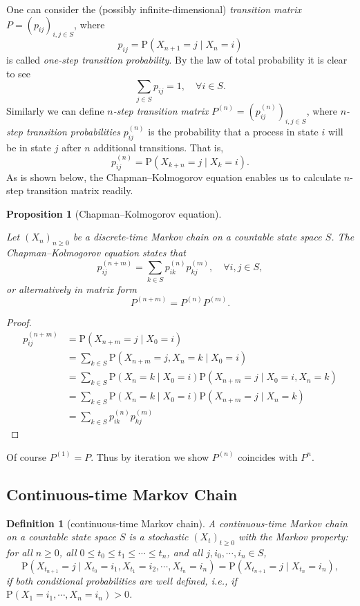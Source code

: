 \documentclass{article}
\newtheorem{definition}{Definition}[section]
\newtheorem{proposition}{Proposition}[section]
\theoremstyle{nonumberplain}
\newtheorem{proof}{Proof.}
\begin{document}
\noindent One can consider the (possibly infinite-dimensional) \emph{transition matrix}	$P=(p_{ij})_{i,j\in S}$, where
\[
p_{ij}=\mathrm{P}(X_{n+1}=j\mid X_{n}=i)
\]
is called \emph{one-step transition probability}. By the law of total probability it is clear to see 
\[
\sum_{j\in S}p_{ij}=1,\quad\forall i\in S.
\]
Similarly we can define \emph{$n$-step transition matrix} $P^{(n)}=\left(p^{(n)}_{ij}\right)_{i,j\in S}$, where \emph{$n$-step transition probabilities} $p^{(n)}_{ij}$ is the probability that a process in state $i$ will be in state $j$ after $n$ additional transitions. That is,
\[
p^{(n)}_{ij}=\mathrm{P}(X_{k+n}=j\mid X_{k}=i).
\]
As is shown below, the Chapman–Kolmogorov equation enables us to calculate $n$-step transition matrix readily.
\begin{proposition}[Chapman–Kolmogorov equation]\hypertarget{Proposition 4.1}{}
Let $(X_n)_{n\ge0}$ be a discrete-time Markov chain on a countable state space $S$. The \emph{Chapman–Kolmogorov equation} states that
\[
p^{(n+m)}_{ij}=\sum_{k\in S}p^{(n)}_{ik}p^{(m)}_{kj},\quad\forall i,j\in S,
\]
or alternatively in matrix form
\[
P^{(n+m)}=P^{(n)}P^{(m)}.
\]
\end{proposition}
\begin{proof}
	\[
	\begin{aligned}
		p^{(n+m)}_{ij}&=\mathrm{P}(X_{n+m}=j\mid X_{0}=i)\\
		&=\sum_{k\in S}\mathrm{P}(X_{n+m}=j,X_{n}=k\mid X_{0}=i)\\
		&=\sum_{k\in S}\mathrm{P}(X_{n}=k\mid X_{0}=i)\mathrm{P}(X_{n+m}=j\mid X_{0}=i,X_{n}=k)\\
		&=\sum_{k\in S}\mathrm{P}(X_{n}=k\mid X_{0}=i)\mathrm{P}(X_{n+m}=j\mid X_{n}=k)\\
		&=\sum_{k\in S}p^{(n)}_{ik}p^{(m)}_{kj}
	\end{aligned}
	\]
\end{proof}

\noindent Of course $P^{(1)}=P$. Thus by iteration we show $P^{(n)}$ coincides with $P^n$.

\subsection{Continuous-time Markov Chain}

\begin{definition}[continuous-time Markov chain]
	A \emph{continuous-time Markov chain} on a countable state space $S$ is a stochastic $(X_t)_{t\ge 0}$ with the Markov property: for all $ n\ge0$, all $0\le t_0\le t_1\le \cdots\le t_n$, and all	$j,i_0,\cdots,i_n\in S$,
	\[
	\mathrm{P}(X_{t_{n+1}}=j\mid X_{t_0}=i_{1},X_{t_1}=i_{2},\cdots,X_{t_n}=i_{n})=\mathrm{P}(X_{t_{n+1}}=j\mid X_{t_n}=i_{n}), 
	\] if both conditional probabilities are well defined, i.e., if $ 	\mathrm{P}(X_{1}=i_{1},\cdots ,X_{n}=i_{n})>0$.
\end{definition}
\end{document}
